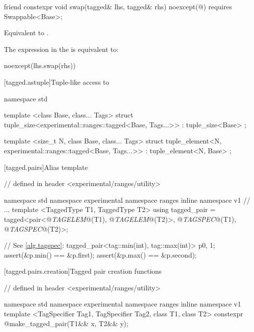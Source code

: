 %
\begin{itemdecl}
friend constexpr void swap(tagged& lhs, tagged& rhs) noexcept(@\seebelow@)
  requires Swappable<Base>;
\end{itemdecl}

\begin{itemdescr}
\pnum
\effects Equivalent to .

\pnum
\remarks The expression in the  is equivalent to:

\begin{codeblock}
noexcept(lhs.swap(rhs))
\end{codeblock}
\end{itemdescr}

[tagged.astuple]{Tuple-like access to }

%
%
\begin{itemdecl}
namespace std {
  template <class Base, class... Tags>
  struct tuple_size<experimental::ranges::tagged<Base, Tags...>>
    : tuple_size<Base> { };

  template <size_t N, class Base, class... Tags>
  struct tuple_element<N, experimental::ranges::tagged<Base, Tags...>>
    : tuple_element<N, Base> { };
}
\end{itemdecl}

[tagged.pairs]{Alias template }

\begin{codeblock}
// defined in header <experimental/ranges/utility>

namespace std { namespace experimental { namespace ranges { inline namespace v1 {
  // ...
  template <TaggedType T1, TaggedType T2>
  using tagged_pair = tagged<pair<@\textit{TAGELEM}@(T1), @\textit{TAGELEM}@(T2)>,
                             @\textit{TAGSPEC}@(T1), @\textit{TAGSPEC}@(T2)>;
}}}}
\end{codeblock}

\pnum \enterexample
\begin{codeblock}
// See \ref{alg.tagspec}:
tagged_pair<tag::min(int), tag::max(int)> p{0, 1};
assert(&p.min() == &p.first);
assert(&p.max() == &p.second);
\end{codeblock}
\exitexample

[tagged.pairs.creation]{Tagged pair creation functions}

%
\begin{itemdecl}
// defined in header <experimental/ranges/utility>

namespace std { namespace experimental { namespace ranges { inline namespace v1 {
  template <TagSpecifier Tag1, TagSpecifier Tag2, class T1, class T2>
    constexpr @\seebelow@ make_tagged_pair(T1&& x, T2&& y);
}}}}
\end{itemdecl}

